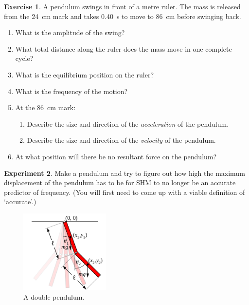 \documentclass[a4paper]{amsbook}
\theoremstyle{definition}
\newtheorem{exercise}{Exercise}
\numberwithin{exercise}{chapter}
\numberwithin{exercise}{chapter}
\newtheorem{experiment}[exercise]{Experiment}
\begin{document}
\begin{exercise}
  A pendulum swings in front of a metre ruler. The mass is released from the \SI{24}{\centi\metre} mark and
  takes \SI{0.40}{\second} to move to \SI{86}{\centi\metre} before swinging back.
  \begin{enumerate}
    \item What is the amplitude of the swing?
    \item What total distance along the ruler does the mass move in one complete cycle?
    \item What is the equilibrium position on the ruler?
    \item What is the frequency of the motion?
    \item At the \SI{86}{\centi\metre} mark:
      \begin{enumerate}
        \item Describe the size and direction of the \emph{acceleration} of the pendulum.
        \item Describe the size and direction of the \emph{velocity} of the pendulum.
      \end{enumerate}
    \item At what position will there be no resultant force on the pendulum?
  \end{enumerate}
\end{exercise}

\begin{experiment}
  Make a pendulum and try to figure out how high the maximum displacement of the pendulum
  has to be for SHM to no longer be an accurate predictor of frequency. (You will first need
  to come up with a viable definition of `accurate'.)
\end{experiment}

\begin{figure}
  \centering
  \includegraphics[width=0.4\textwidth]{multipend}
  \caption{A double pendulum.\label{fig:multipend}}
\end{figure}
\end{document}
